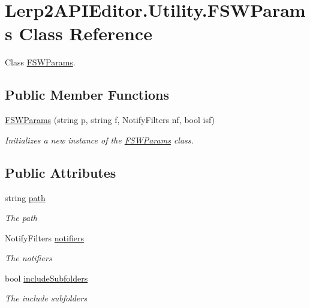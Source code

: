 \hypertarget{class_lerp2_a_p_i_editor_1_1_utility_1_1_f_s_w_params}{}\section{Lerp2\+A\+P\+I\+Editor.\+Utility.\+F\+S\+W\+Params Class Reference}
\label{class_lerp2_a_p_i_editor_1_1_utility_1_1_f_s_w_params}


Class \hyperlink{class_lerp2_a_p_i_editor_1_1_utility_1_1_f_s_w_params}{F\+S\+W\+Params}.  


\subsection*{Public Member Functions}
\begin{DoxyCompactItemize}
\item 
\hyperlink{class_lerp2_a_p_i_editor_1_1_utility_1_1_f_s_w_params_a5d78516efbcf0fd0e6a8d9f39d0f2dc3}{F\+S\+W\+Params} (string p, string f, Notify\+Filters nf, bool isf)
\begin{DoxyCompactList}\small\item\em Initializes a new instance of the \hyperlink{class_lerp2_a_p_i_editor_1_1_utility_1_1_f_s_w_params}{F\+S\+W\+Params} class. \end{DoxyCompactList}\end{DoxyCompactItemize}
\subsection*{Public Attributes}
\begin{DoxyCompactItemize}
\item 
string \hyperlink{class_lerp2_a_p_i_editor_1_1_utility_1_1_f_s_w_params_ada2e0ac36c5889a9651938f2c5666f49}{path}
\begin{DoxyCompactList}\small\item\em The path \end{DoxyCompactList}\item 
Notify\+Filters \hyperlink{class_lerp2_a_p_i_editor_1_1_utility_1_1_f_s_w_params_a1a773e1650813f529e34db2ed0864647}{notifiers}
\begin{DoxyCompactList}\small\item\em The notifiers \end{DoxyCompactList}\item 
bool \hyperlink{class_lerp2_a_p_i_editor_1_1_utility_1_1_f_s_w_params_a1d968e39947e0de9cfcab29bbd30a510}{include\+Subfolders}
\begin{DoxyCompactList}\small\item\em The include subfolders \end{DoxyCompactList}\end{DoxyCompactItemize}


